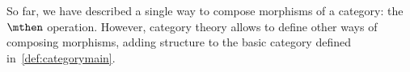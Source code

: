 \devel{}


So far, we have described a single way to compose morphisms of a category: the~$\mthen$ operation.
However, category theory allows to define other ways of composing morphisms, adding structure to the basic category defined in~\cref{def:categorymain}.

